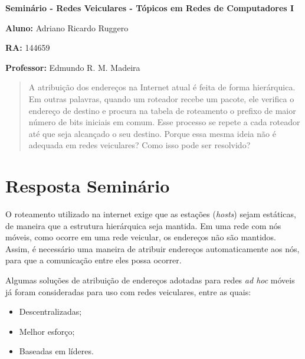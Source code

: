 \documentclass[12pt,twoside,a4paper]{article}
\begin{document}
\vskip 15mm

\begin{center} 
\textbf{Seminário  - Redes Veiculares - Tópicos em Redes de Computadores I}

\end{center}

\vskip 5mm

\textbf{Aluno:} Adriano Ricardo Ruggero

\textbf{RA:} 144659

\textbf{Professor:} Edmundo R. M. Madeira

\vskip 20mm

\begin{abstract}

A atribuição dos endereços na Internet atual é feita de forma hierárquica. Em outras palavras, quando um roteador recebe um pacote, ele verifica o endereço de destino e procura na tabela de roteamento o prefixo de maior número de bits iniciais em comum. Esse processo se repete a cada roteador até que seja alcançado o seu destino. Porque essa mesma ideia não é adequada em redes veiculares? Como isso pode ser resolvido?

\end{abstract}

\newpage
\pagestyle{plain}
\headheight 0.0cm
\headsep 0.0cm
\footskip 2.2cm

\section{Resposta Seminário}
\label{sec:01}

O roteamento utilizado na internet exige que as estações (\textit{hosts}) sejam estáticas, de maneira que a estrutura hierárquica seja mantida. Em uma rede com nós móveis, como ocorre em uma rede veicular, os endereços não são mantidos. Assim, é necessário uma maneira de atribuir endereços automaticamente aos nós, para que a comunicação entre eles possa ocorrer.

Algumas soluções de atribuição de endereços adotadas para redes \textit{ad hoc} móveis já foram consideradas para uso com redes veiculares, entre as quais:

\begin{itemize}

\item Descentralizadas;

\item Melhor esforço;

\item Baseadas em líderes.

\end{itemize}
\end{document}
